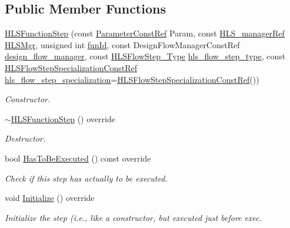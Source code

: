 \subsection*{Public Member Functions}
\begin{DoxyCompactItemize}
\item 
\hyperlink{classHLSFunctionStep_a82817efb94f0eae6d614bbcec1c99293}{H\+L\+S\+Function\+Step} (const \hyperlink{Parameter_8hpp_a37841774a6fcb479b597fdf8955eb4ea}{Parameter\+Const\+Ref} Param, const \hyperlink{hls__manager_8hpp_acd3842b8589fe52c08fc0b2fcc813bfe}{H\+L\+S\+\_\+manager\+Ref} \hyperlink{classHLS__step_ade85003a99d34134418451ddc46a18e9}{H\+L\+S\+Mgr}, unsigned int \hyperlink{classHLSFunctionStep_a3e6434fd86c698b0c70520b859bff5b0}{fun\+Id}, const Design\+Flow\+Manager\+Const\+Ref \hyperlink{classDesignFlowStep_ab770677ddf087613add30024e16a5554}{design\+\_\+flow\+\_\+manager}, const \hyperlink{hls__step_8hpp_ada16bc22905016180e26fc7e39537f8d}{H\+L\+S\+Flow\+Step\+\_\+\+Type} \hyperlink{classHLS__step_aefd59af15346ec3f10bf12bd756e6777}{hls\+\_\+flow\+\_\+step\+\_\+type}, const \hyperlink{hls__step_8hpp_a5fdd2edf290c196531d21d68e13f0e74}{H\+L\+S\+Flow\+Step\+Specialization\+Const\+Ref} \hyperlink{classHLS__step_a843be75ba53b81876aa3c8b870ae8a55}{hls\+\_\+flow\+\_\+step\+\_\+specialization}=\hyperlink{hls__step_8hpp_a5fdd2edf290c196531d21d68e13f0e74}{H\+L\+S\+Flow\+Step\+Specialization\+Const\+Ref}())
\begin{DoxyCompactList}\small\item\em Constructor. \end{DoxyCompactList}\item 
\hyperlink{classHLSFunctionStep_a7dd044b202977e978dd096a53ede7d61}{$\sim$\+H\+L\+S\+Function\+Step} () override
\begin{DoxyCompactList}\small\item\em Destructor. \end{DoxyCompactList}\item 
bool \hyperlink{classHLSFunctionStep_ac70d2df8fd475639bf9b5c8d492b2d62}{Has\+To\+Be\+Executed} () const override
\begin{DoxyCompactList}\small\item\em Check if this step has actually to be executed. \end{DoxyCompactList}\item 
void \hyperlink{classHLSFunctionStep_a966629ba62a8188ff4fa783ab0d4e319}{Initialize} () override
\begin{DoxyCompactList}\small\item\em Initialize the step (i.\+e., like a constructor, but executed just before exec. \end{DoxyCompactList}\item 

\end{DoxyCompactItemize}
